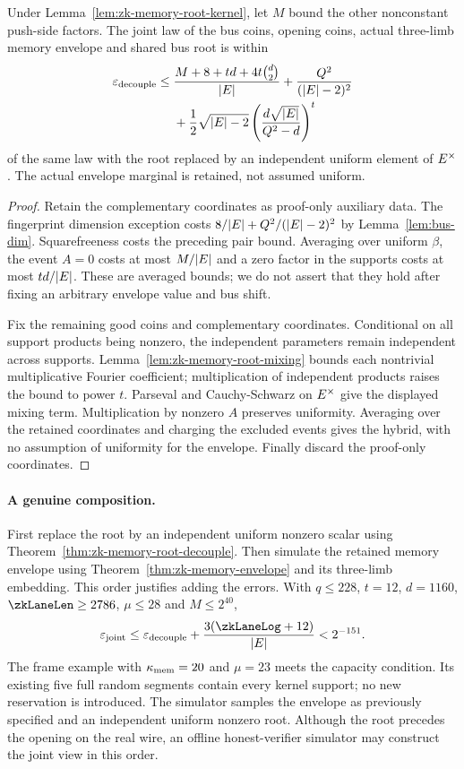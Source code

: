 \begin{theorem}\label{thm:zk-memory-root-decouple}
Under Lemma~\ref{lem:zk-memory-root-kernel}, let $M$ bound the other nonconstant push-side factors. The joint law of the bus coins, opening coins, actual three-limb memory envelope and shared bus root is within
\[
 \begin{split}
 \varepsilon_{\mathrm{decouple}}\le{}&
 \frac{M+8+td+4t\binom d2}{|E|}
 +\frac{Q^2}{(|E|-2)^2}\\
 &+\frac12\sqrt{|E|-2}
 \left(\frac{d\sqrt{|E|}}{Q^2-d}\right)^t
 \end{split}
\]
of the same law with the root replaced by an independent uniform element of $E^\times$. The actual envelope marginal is retained, not assumed uniform.
\end{theorem}
\begin{proof}
Retain the complementary coordinates as proof-only auxiliary data. The fingerprint dimension exception costs $8/|E|+Q^2/(|E|-2)^2$ by Lemma~\ref{lem:bus-dim}. Squarefreeness costs the preceding pair bound. Averaging over uniform $\beta$, the event $A=0$ costs at most $M/|E|$ and a zero factor in the supports costs at most $td/|E|$. These are averaged bounds; we do not assert that they hold after fixing an arbitrary envelope value and bus shift.

Fix the remaining good coins and complementary coordinates. Conditional on all support products being nonzero, the independent parameters remain independent across supports. Lemma~\ref{lem:zk-memory-root-mixing} bounds each nontrivial multiplicative Fourier coefficient; multiplication of independent products raises the bound to power $t$. Parseval and Cauchy-Schwarz on $E^\times$ give the displayed mixing term. Multiplication by nonzero $A$ preserves uniformity. Averaging over the retained coordinates and charging the excluded events gives the hybrid, with no assumption of uniformity for the envelope. Finally discard the proof-only coordinates.
\end{proof}

\paragraph{A genuine composition.} First replace the root by an independent uniform nonzero scalar using Theorem~\ref{thm:zk-memory-root-decouple}. Then simulate the retained memory envelope using Theorem~\ref{thm:zk-memory-envelope} and its three-limb embedding. This order justifies adding the errors. With $q\le228$, $t=12$, $d=1160$, $\zkLaneLen\ge2786$, $\mu\le28$ and $M\le2^{40}$,
\[
 \varepsilon_{\mathrm{joint}}
 \le\varepsilon_{\mathrm{decouple}}
       +\frac{3(\zkLaneLog+12)}{|\E|}
 <2^{-151}.
\]
The frame example with $\kappa_{\mathrm{mem}}=20$ and $\mu=23$ meets the capacity condition. Its existing five full random segments contain every kernel support; no new reservation is introduced. The simulator samples the envelope as previously specified and an independent uniform nonzero root. Although the root precedes the opening on the real wire, an offline honest-verifier simulator may construct the joint view in this order.

